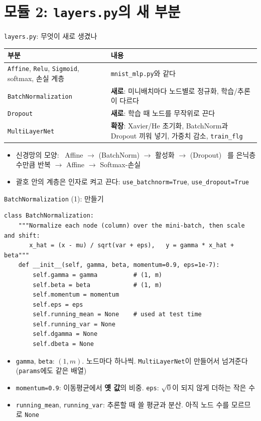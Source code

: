\documentclass[aspectratio=169,11pt]{beamer}
\newcommand{\code}[1]{\texttt{#1}}
\begin{document}
\section{모듈 2: \texttt{layers.py}의 새 부분}

\begin{frame}{\code{layers.py}: 무엇이 새로 생겼나}
\centering
\small
\renewcommand{\arraystretch}{1.25}
\begin{tabular}{>{\raggedright}p{4.2cm}>{\raggedright\arraybackslash}p{8.6cm}}
\toprule
\textbf{부분} & \textbf{내용} \\
\midrule
\code{Affine}, \code{Relu}, \code{Sigmoid}, softmax, 손실 계층 & \code{mnist\_mlp.py}와 같다 \\
\code{BatchNormalization} & \textbf{새로}: 미니배치마다 노드별로 정규화, 학습/추론이 다르다 \\
\code{Dropout} & \textbf{새로}: 학습 때 노드를 무작위로 끈다 \\
\code{MultiLayerNet} & \textbf{확장}: Xavier/He 초기화, BatchNorm과 Dropout 끼워 넣기, 가중치 감소, \code{train\_flg} \\
\bottomrule
\end{tabular}
\vskip3mm
\raggedright
\begin{itemize}
\item 신경망의 모양: \ Affine $\to$ (BatchNorm) $\to$ 활성화 $\to$ (Dropout) \ 를 은닉층 수만큼 반복 $\to$ Affine $\to$ Softmax-손실
\item 괄호 안의 계층은 인자로 켜고 끈다: \code{use\_batchnorm=True}, \code{use\_dropout=True}
\end{itemize}
\end{frame}

\begin{frame}[fragile]{\code{BatchNormalization} (1): 만들기}
\begin{lstlisting}
class BatchNormalization:
    """Normalize each node (column) over the mini-batch, then scale and shift:
       x_hat = (x - mu) / sqrt(var + eps),   y = gamma * x_hat + beta"""
    def __init__(self, gamma, beta, momentum=0.9, eps=1e-7):
        self.gamma = gamma          # (1, m)
        self.beta = beta            # (1, m)
        self.momentum = momentum
        self.eps = eps
        self.running_mean = None    # used at test time
        self.running_var = None
        self.dgamma = None
        self.dbeta = None
\end{lstlisting}
\begin{itemize}
\item \code{gamma}, \code{beta}: $(1,m)$. 노드마다 하나씩. \code{MultiLayerNet}이 만들어서 넘겨준다 (\code{params}에도 같은 배열)
\item \code{momentum=0.9}: 이동평균에서 \textbf{옛 값}의 비중. \code{eps}: $\sqrt{0}$이 되지 않게 더하는 작은 수
\item \code{running\_mean}, \code{running\_var}: 추론할 때 쓸 평균과 분산. 아직 노드 수를 모르므로 \code{None}
\end{itemize}
\end{frame}
\end{document}
